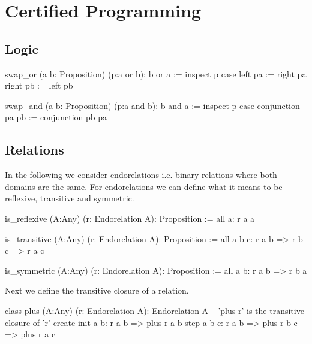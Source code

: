 
\chapter{Certified Programming}
\label{chap:certprog}





\newpage
\section{Logic}
\label{sec:certprog-logic}


\begin{alba}
  swap_or (a b: Proposition) (p:a or b): b or a :=
    inspect
      p
    case
      left  pa := right pa
      right pb := left  pb
\end{alba}



\begin{alba}
  swap_and (a b: Proposition) (p:a and b): b and a :=
    inspect
      p
    case
      conjunction pa pb :=
        conjunction pb pa
\end{alba}










\newpage
\section{Relations}
\label{sec:certprog-relations}


In the following we consider endorelations i.e. binary relations where both
domains are the same. For endorelations we can define what it means to be
reflexive, transitive and symmetric.

\begin{alba}
  is_reflexive (A:Any) (r: Endorelation A): Proposition :=
    all a: r a a

  is_transitive (A:Any) (r: Endorelation A): Proposition :=
    all a b c: r a b => r b c => r a c

  is_symmetric (A:Any) (r: Endorelation A): Proposition :=
    all a b: r a b => r b a
\end{alba}


Next we define the transitive closure of a relation.

\begin{alba}
  class
    plus (A:Any) (r: Endorelation A): Endorelation A
      -- 'plus r' is the transitive closure of 'r'
  create
    init a b:
      r a b
      => plus r a b
    step a b c:
      r a b
      => plus r b c
      => plus r a c
\end{alba}


